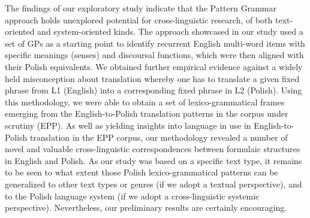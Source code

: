 \documentclass[output=paper]{langscibook}
\begin{document}
The findings of our exploratory study indicate that the Pattern Grammar approach holds unexplored potential for cross-linguistic research, of both text-ori\-ent\-ed and system-oriented kinds. The approach showcased in our study used a set of GPs as a starting point to identify recurrent English multi-word items with specific meanings (senses) and discoursal functions, which were then aligned with their Polish equivalents. We obtained further empirical evidence against a widely held misconception about translation whereby one has to translate a given fixed phrase from L1 (English) into a corresponding fixed phrase in L2 (Polish). Using this methodology, we were able to obtain a set of lexico-grammatical frames emerging from the English-to-Polish translation patterns in the corpus under scrutiny (EPP). As well as yielding insights into language in use in English-to-Polish translation in the EPP corpus, our methodology revealed a number of novel and valuable cross-linguistic correspondences between formulaic structures in English and Polish. As our study was based on a specific text type, it remains to be seen to what extent those Polish lexico-grammatical patterns can be generalized to other text types or genres (if we adopt a textual perspective), and to the Polish language system (if we adopt a cross-linguistic systemic perspective). Nevertheless, our preliminary results are certainly encouraging. 
\end{document}
